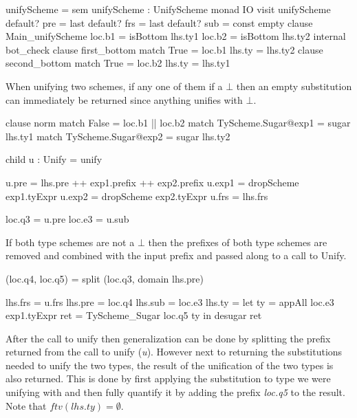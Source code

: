 \begin{code}
unifyScheme = sem unifyScheme : UnifyScheme monad IO
                visit unifyScheme
                  default? pre = last
                  default? frs = last
                  default? sub = const empty
                  clause Main_unifyScheme
                      loc.b1 = isBottom lhs.ty1
                      loc.b2 = isBottom lhs.ty2
                      internal bot_check
                        clause first_bottom
                            match True = loc.b1
                            lhs.ty     = lhs.ty2
                        clause second_bottom
                            match True = loc.b2
                            lhs.ty     = lhs.ty1
\end{code}
When unifying two schemes, if any one of them if a $\bot$ then an empty substitution can immediately be returned since anything unifies with $\bot$. 

\begin{code}
   clause norm
       match False = loc.b1 || loc.b2
       match TyScheme.Sugar@exp1 = sugar lhs.ty1
       match TyScheme.Sugar@exp2 = sugar lhs.ty2
           
       child u : Unify = unify
           
       u.pre  = lhs.pre ++ exp1.prefix ++ exp2.prefix
       u.exp1 = dropScheme exp1.tyExpr
       u.exp2 = dropScheme exp2.tyExpr
       u.frs  = lhs.frs
           
       loc.q3 = u.pre
       loc.e3 = u.sub
\end{code}
If both type schemes are not a $\bot$ then the prefixes of both type schemes are removed and combined with the input prefix and passed along to a call to Unify.

\begin{code}    
   (loc.q4, loc.q5) = split (loc.q3, domain lhs.pre)
       
   lhs.frs = u.frs
   lhs.pre = loc.q4
   lhs.sub = loc.e3
   lhs.ty  = let ty  = appAll loc.e3 exp1.tyExpr
                 ret = TyScheme_Sugar loc.q5 ty
             in desugar ret
\end{code}
After the call to unify then generalization can be done by splitting the prefix returned from the call to unify (\emph{u}). However next to returning the substitutions needed to unify the two types, the result of the unification of the two types is also returned. This is done by first applying the substitution to type we were unifying with and then fully quantify it by adding the prefix \emph{loc.q5} to the result. Note that $ftv(lhs.ty)=\emptyset$.

